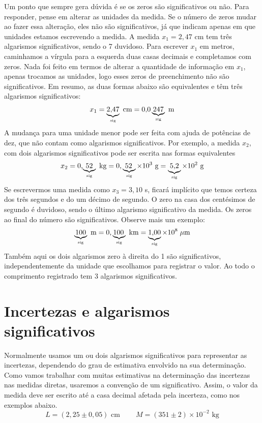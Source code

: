 Um ponto que sempre gera dúvida é se os zeros são significativos ou não. Para responder, pense em alterar as unidades da medida. Se o número de zeros mudar ao fazer essa alteração, eles não são significativos, já que indicam apenas em que unidades estamos escrevendo a medida.  A medida ${x_1}=2,\!47$ cm tem três algarismos significativos, sendo o 7 duvidoso. Para escrever ${x_1}$ em metros, caminhamos a vírgula para a esquerda duas casas decimais e completamos com zeros. Nada foi feito em termos de alterar a quantidade de  informação em ${x_1}$, apenas trocamos as unidades, logo esses zeros de preenchimento não são significativos. Em resumo, as duas formas abaixo são equivalentes e têm três algarismos significativos:
\[
x_1=\underbrace{2,\!47}_{\mbox{\tiny sig}}\mbox{ cm} = 0,\!0\underbrace{247}_{\mbox{\tiny sig}}\mbox{ m}
\]
%
A mudança para uma unidade menor pode ser feita com ajuda de potências de dez, que não contam como algarismos significativos. Por exemplo, a medida ${x_2}$, com dois algarismos significativos pode ser escrita nas formas equivalentes
\[
{x_2}= 0,\!\underbrace{52}_{\mbox{\tiny sig}}\mbox{ kg} = 0,\underbrace{\!52}_{\mbox{\tiny sig}} \times 10^{3}\mbox{ g}  = \underbrace{5,\! 2}_{\mbox{\tiny sig}} \times 10^{2}\mbox{ g}
\]
%
Se escrevermos uma medida como ${x_3}=3,\!10$ s, ficará implícito que temos certeza dos três segundos e do um décimo de segundo. O zero na casa dos centésimos de segundo é duvidoso, sendo o último algarismo significativo da medida. Os zeros ao final do número são significativos. Observe mais um exemplo:
\[
\underbrace{100}_{\mbox{\tiny sig}}\mbox{ m}= 0,\underbrace{\!100}_{\mbox{\tiny sig}}\mbox{ km} = \underbrace{1,\!00}_{\mbox{\tiny sig}}\times 10^{8}\;\mu\mbox{m}
\]
%
Também aqui os dois algarismos zero à direita do 1 são significativos, independentemente da unidade que escolhamos para registrar o valor. Ao todo o comprimento registrado tem 3 algarismos significativos.

\section{Incertezas e algarismos significativos}
%
%
Normalmente usamos um ou dois algarismos significativos para representar as incertezas, dependendo do grau de estimativa envolvido na sua determina\c c\~ao. Como vamos trabalhar com muitas estimativas na determina\c c\~ao das incertezas nas medidas diretas, usaremos a conven\c c\~ao de um significativo. Assim, o valor da medida deve ser escrito at\'e a casa decimal afetada pela incerteza, como nos exemplos abaixo.
%
\[
L = (2,\!25\pm 0,\!05)\mbox{ cm} \;\;\;\;\;\;\;\;  M = (351 \pm 2)\times 10^{-2}\mbox{ kg}
\]

